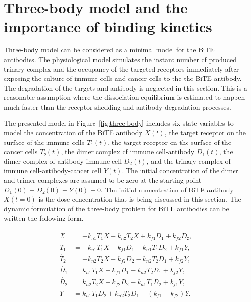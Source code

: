 \section{Three-body model and the importance of binding kinetics} \label{sec:three-body}

Three-body model can be considered as a minimal model for the \ac{BiTE} antibodies. The physiological model simulates the instant number of produced trinary complex and the occupancy of the targeted receptors immediately after exposing the culture of immune cells and cancer cells to the the \ac{BiTE} antibody. The degradation of the targets and antibody is neglected in this section. This is a reasonable assumption where the dissociation equilibrium is estimated to happen much faster than the receptor shedding and antibody degradation processes.

The presented model in Figure~\ref{fig:three-body} includes six state variables to model the concentration of the \ac{BiTE} antibody $X(t)$, the target receptor on the surface of the immune cells $T_1(t)$, the target receptor on the surface of the cancer cells $T_2(t)$, the dimer complex of immune cell-antibody $D_1(t)$, the dimer complex of antibody-immune cell $D_2(t)$, and the trinary complex of immune cell-antibody-cancer cell $Y(t)$. The initial concentration of the dimer and trimer complexes are assumed to be zero at the starting point $D_1(0)=D_2(0)=Y(0)=0$. The initial concentration of \ac{BiTE} antibody $X(t=0)$ is the dose concentration that is being discussed in this section. The dynamic formulation of the three-body problem for \ac{BiTE} antibodies can be written the following form.

\begin{subequations}\label{eq:three-body}
	\begin{align}
		\dot{X} &  = - k_{n1} T_1 X - k_{n2} T_2 X + k_{f1} D_1 + k_{f2} D_2,\\
		\dot{T_1} & = - k_{n1} T_1 X + k_{f1} D_1 - k_{n1} T_1 D_2 + k_{f1} Y,\\
		\dot{T_2} & = - k_{n2} T_2 X + k_{f2} D_2 - k_{n2} T_2 D_1 + k_{f2} Y,\\
		\dot{D_1} & = k_{n1} T_1 X - k_{f1} D_1 - k_{n2} T_2 D_1 + k_{f2} Y ,\\
		\dot{D_2} & = k_{n2} T_2 X - k_{f2} D_2 - k_{n1} T_1 D_2 + k_{f1} Y,\\
		\dot{Y} & = k_{n1} T_1 D_2 + k_{n2} T_2 D_1 - (k_{f1}+k_{f2}) Y.
	\end{align}
\end{subequations}

